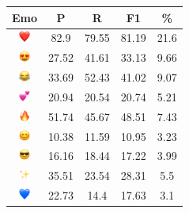 \documentclass{article}
\begin{document}
\begin{table}
\centering
\begin{tabular}{|c|ccc|c|} \hline
\textbf{Emo} & \textbf{P} & \textbf{R} & \textbf{F1} & \textbf{\%} \\ \hline
\includegraphics[height=0.37cm,width=0.37cm]{img/red_heart.png} & 82.9 & 79.55 & 81.19 & 21.6\\ 
\includegraphics[height=0.37cm,width=0.37cm]{img/smiling_face_with_hearteyes.png} & 27.52 & 41.61 & 33.13 & 9.66\\ 
\includegraphics[height=0.37cm,width=0.37cm]{img/face_with_tears_of_joy.png} & 33.69 & 52.43 & 41.02 & 9.07\\ 
\includegraphics[height=0.37cm,width=0.37cm]{img/two_hearts.png} & 20.94 & 20.54 & 20.74 & 5.21\\ 
\includegraphics[height=0.37cm,width=0.37cm]{img/fire.png} & 51.74 & 45.67 & 48.51 & 7.43\\ 
\includegraphics[height=0.37cm,width=0.37cm]{img/smiling_face_with_smiling_eyes.png} & 10.38 & 11.59 & 10.95 & 3.23\\ 
\includegraphics[height=0.37cm,width=0.37cm]{img/smiling_face_with_sunglasses.png} & 16.16 & 18.44 & 17.22 & 3.99\\ 
\includegraphics[height=0.37cm,width=0.37cm]{img/sparkles.png} & 35.51 & 23.54 & 28.31 & 5.5\\ 
\includegraphics[height=0.37cm,width=0.37cm]{img/blue_heart.png} & 22.73 & 14.4 & 17.63 & 3.1\\ 

\end{tabular}
\end{table}
\end{document}
